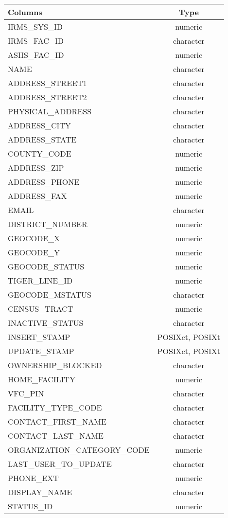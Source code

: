 \documentclass[
  letterpaper,
  DIV=11,
  numbers=noendperiod]{scrreprt}
\begin{document}
\begin{longtable}{lc}
\toprule
Columns & Type \\ 
\midrule
IRMS\_SYS\_ID & numeric \\ 
IRMS\_FAC\_ID & character \\ 
ASIIS\_FAC\_ID & numeric \\ 
NAME & character \\ 
ADDRESS\_STREET1 & character \\ 
ADDRESS\_STREET2 & character \\ 
PHYSICAL\_ADDRESS & character \\ 
ADDRESS\_CITY & character \\ 
ADDRESS\_STATE & character \\ 
COUNTY\_CODE & numeric \\ 
ADDRESS\_ZIP & numeric \\ 
ADDRESS\_PHONE & numeric \\ 
ADDRESS\_FAX & numeric \\ 
EMAIL & character \\ 
DISTRICT\_NUMBER & numeric \\ 
GEOCODE\_X & numeric \\ 
GEOCODE\_Y & numeric \\ 
GEOCODE\_STATUS & numeric \\ 
TIGER\_LINE\_ID & numeric \\ 
GEOCODE\_MSTATUS & character \\ 
CENSUS\_TRACT & numeric \\ 
INACTIVE\_STATUS & character \\ 
INSERT\_STAMP & POSIXct, POSIXt \\ 
UPDATE\_STAMP & POSIXct, POSIXt \\ 
OWNERSHIP\_BLOCKED & character \\ 
HOME\_FACILITY & numeric \\ 
VFC\_PIN & character \\ 
FACILITY\_TYPE\_CODE & character \\ 
CONTACT\_FIRST\_NAME & character \\ 
CONTACT\_LAST\_NAME & character \\ 
ORGANIZATION\_CATEGORY\_CODE & numeric \\ 
LAST\_USER\_TO\_UPDATE & character \\ 
PHONE\_EXT & numeric \\ 
DISPLAY\_NAME & character \\ 
STATUS\_ID & numeric \\ 

\end{longtable}
\end{document}
